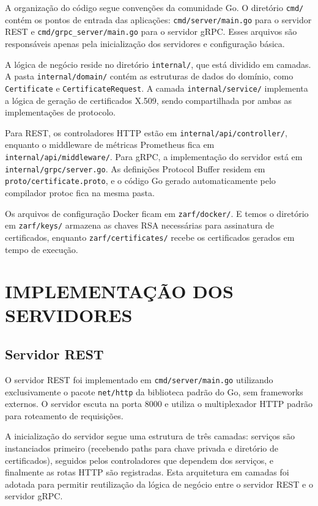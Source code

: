 A organização do código segue convenções da comunidade Go. O diretório \texttt{cmd/} contém os pontos de entrada das aplicações: \texttt{cmd/server/main.go} para o servidor REST e \texttt{cmd/grpc\_server/main.go} para o servidor gRPC. Esses arquivos são responsáveis apenas pela inicialização dos servidores e configuração básica.

A lógica de negócio reside no diretório \texttt{internal/}, que está dividido em camadas. A pasta \texttt{internal/domain/} contém as estruturas de dados do domínio, como \texttt{Certificate} e \texttt{CertificateRequest}. A camada \texttt{internal/service/} implementa a lógica de geração de certificados X.509, sendo compartilhada por ambas as implementações de protocolo.

Para REST, os controladores HTTP estão em \texttt{internal/api/controller/}, enquanto o middleware de métricas Prometheus fica em \texttt{internal/api/middleware/}. Para gRPC, a implementação do servidor está em \texttt{internal/grpc/server.go}. As definições Protocol Buffer residem em \texttt{proto/certificate.proto}, e o código Go gerado automaticamente pelo compilador protoc fica na mesma pasta.

Os arquivos de configuração Docker ficam em \texttt{zarf/docker/}. E temos o diretório em \texttt{zarf/keys/} armazena as chaves RSA necessárias para assinatura de certificados, enquanto \texttt{zarf/certificates/} recebe os certificados gerados em tempo de execução.

\section{IMPLEMENTAÇÃO DOS SERVIDORES}\label{sec:servidores}

\subsection{Servidor REST}

O servidor REST foi implementado em \texttt{cmd/server/main.go} utilizando exclusivamente o pacote \texttt{net/http} da biblioteca padrão do Go, sem frameworks externos. O servidor escuta na porta 8000 e utiliza o multiplexador HTTP padrão para roteamento de requisições.

A inicialização do servidor segue uma estrutura de três camadas: serviços são instanciados primeiro (recebendo paths para chave privada e diretório de certificados), seguidos pelos controladores que dependem dos serviços, e finalmente as rotas HTTP são registradas. Esta arquitetura em camadas foi adotada para permitir reutilização da lógica de negócio entre o servidor REST e o servidor gRPC.

